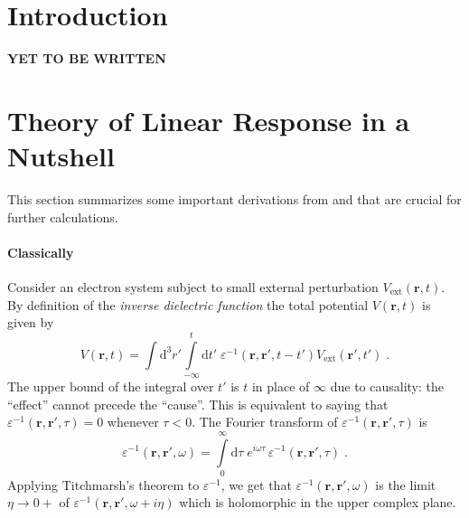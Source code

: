 \documentclass[a4paper,12pt]{article}
\begin{document}
\section{Introduction}
    \textbf{YET TO BE WRITTEN}

\newpage
\section{Theory of Linear Response in a Nutshell} \label{sec:linear_response}
    This section summarizes some important derivations from \cite{vonsovskiui1989quantum} and \cite{giuliani2005quantum} that are crucial for further calculations.
    \paragraph{Classically} Consider an electron system subject to small external perturbation $V_\text{ext}(\mathbf{r}, t)$. By definition of the \textit{inverse dielectric function} the total potential $V(\mathbf{r}, t)$ is given by
    \begin{equation} \label{eq:cl:potentials_t}
        V(\mathbf{r}, t) 
            = \int\!\! \text{d}^3 r' \!\! \int\limits_{-\infty}^{t}\!\! \text{d} t'\; \varepsilon^{-1}(\mathbf{r}, \mathbf{r'}, t - t') V_\text{ext}(\mathbf{r'}, t')\; .
    \end{equation}
    The upper bound of the integral over $t'$ is $t$ in place of $\infty$ due to causality: the ``effect'' cannot precede the ``cause''. This is equivalent to saying that $\varepsilon^{-1}(\mathbf{r}, \mathbf{r'}, \tau) = 0$ whenever $\tau < 0$. The Fourier transform of $\varepsilon^{-1}(\mathbf{r}, \mathbf{r'}, \tau)$ is
    \begin{equation} \label{eq:cl:inv_dielectric_w}
        \varepsilon^{-1}(\mathbf{r},\mathbf{r'},\omega) = \int\limits_{0}^{\infty} \!\! \text{d}\tau \; e^{i\omega \tau}\,\varepsilon^{-1}(\mathbf{r}, \mathbf{r'}, \tau)\; .
    \end{equation}
    Applying Titchmarsh's theorem to $\varepsilon^{-1}$, we get that $\varepsilon^{-1}(\mathbf{r}, \mathbf{r'}, \omega)$ is the limit $\eta \to 0+$ of $\varepsilon^{-1}(\mathbf{r}, \mathbf{r'}, \omega + i\eta)$ which is holomorphic in the upper complex plane.
\end{document}
